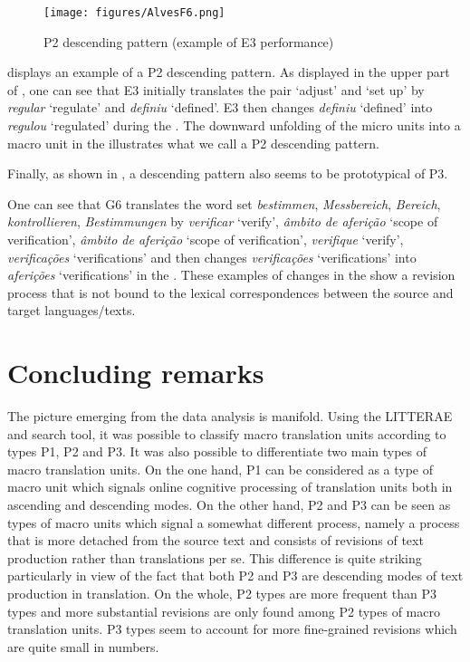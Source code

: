 \documentclass[output=paper]{LSP/langsci}
\begin{document}
\begin{figure}[t]
\texttt{[image: figures/AlvesF6.png]}
\caption{P2 descending pattern (example of E3 performance)}
\label{fig:alves:6}
\end{figure} 

 displays an example of a P2 descending pattern. As displayed in the upper part of , one can see that E3 initially translates the pair `adjust' and `set up'  by \textit{regular} `regulate' and \textit{definiu} `defined'. E3 then changes \textit{definiu} `defined' into \textit{regulou} `regulated' during the . The downward unfolding of the micro units into a macro unit in the  illustrates what we call a P2 descending pattern.


Finally, as shown in , a descending pattern also seems to be prototypical of P3.


One can see that G6 translates the word set \textit{bestimmen}, \textit{Messbereich}, \textit{Bereich}, \textit{kontrollieren}, \textit{Bestimmungen} by \textit{verificar} `verify', \textit{âmbito de aferição} `scope of verification', \textit{âmbito de aferição} `scope of verification', \textit{verifique} `verify', \textit{verificações} `verifications' and then changes \textit{verificações} `verifications' into \textit{aferições} `verifications' in the . These examples of changes in the  show a revision process that is not bound to the lexical correspondences between the source and target languages/texts.


\section{Concluding remarks}\label{sec:alves:5}

The picture emerging from the data analysis is manifold. Using the LITTERAE  and search tool, it was possible to classify macro translation units according to types P1, P2 and P3. It was also possible to differentiate two main types of macro translation units. On the one hand, P1 can be considered as a type of macro unit which signals online cognitive processing of translation units both in ascending and descending modes. On the other hand, P2 and P3 can be seen as types of macro units which signal a somewhat different process, namely a process that is more detached from the source text and consists of revisions of text production rather than translations per se. This difference is quite striking 
particularly in view of the fact that both P2 and P3 are descending modes of text production in translation. On the whole, P2 types are more frequent than P3 types and more substantial revisions are only found  among P2 types of macro translation units. P3 types seem to account for more fine-grained revisions which are quite small in numbers.
\end{document}
